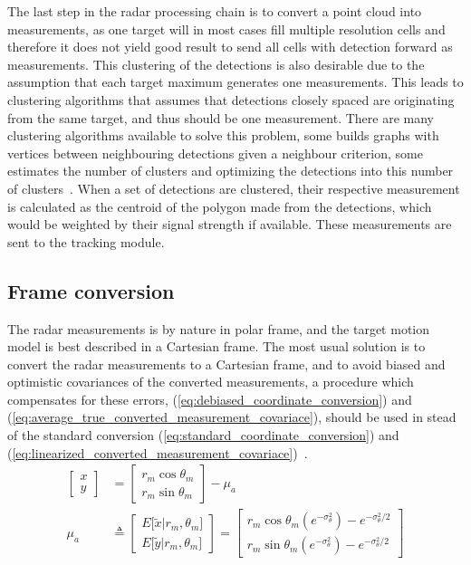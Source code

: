 The last step in the radar processing chain is to convert a point cloud into measurements, as one target will in most cases fill multiple resolution cells and therefore it does not yield good result to send all cells with detection forward as measurements. This clustering of the detections is also desirable due to the assumption that each target maximum generates one measurements. This leads to clustering algorithms that assumes that detections closely spaced are originating from the same target, and thus should be one measurement. There are many clustering algorithms available to solve this problem, some builds graphs with vertices between neighbouring detections given a neighbour criterion, some estimates the number of clusters and optimizing the detections into this number of clusters~\cite{Mahmuddin2010,Pelleg2000,Brekke2010}. When a set of detections are clustered, their respective measurement is calculated as the centroid of the polygon made from the detections, which would be weighted by their signal strength if available. These measurements are sent to the tracking module.

\subsection{Frame conversion}\label{subsec:frame_conversion}
The radar measurements is by nature in polar frame, and the target motion model is best described in a Cartesian frame. The most usual solution is to convert the radar measurements to a Cartesian frame, and to avoid biased and optimistic covariances of the converted measurements, a procedure which compensates for these errors, (\ref{eq:debiased_coordinate_conversion}) and (\ref{eq:average_true_converted_measurement_covariace}), should be used in stead of the standard conversion (\ref{eq:standard_coordinate_conversion}) and (\ref{eq:linearized_converted_measurement_covariace})~\cite{Bar-Shalom1995}.
\begin{equation}\label{eq:debiased_coordinate_conversion}
\begin{split}
\begin{bmatrix} x \\ y \end{bmatrix} &= \begin{bmatrix} r_m \cos \theta_m \\ r_m \sin \theta_m \end{bmatrix} - \mu_a \\
\mu_a & \triangleq 
\begin{bmatrix}
	E \lbrack \tilde{x}|r_m,\theta_m \rbrack \\ 
	E \lbrack \tilde{y}|r_m,\theta_m \rbrack 
\end{bmatrix} 
= 
\begin{bmatrix}
	r_m \cos \theta_m (e^{-\sigma^2_\theta}) - e^{-\sigma^2_\theta / 2} \\ 
	r_m \sin \theta_m (e^{-\sigma^2_\theta}) - e^{-\sigma^2_\theta / 2}
\end{bmatrix} 
\end{split}
\end{equation}


